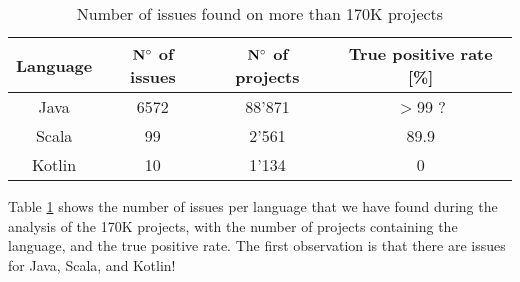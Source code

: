 \begin{table}[h]
	\centering
	\caption{Number of issues found on more than 170K projects}
	\label{table:large_scale_issues}
	\begin{tabular}{|c|c|c|c|}
		\hline
		\bf Language & \bf $\bf N^{\circ}$ of issues & \bf $\bf N^{\circ}$  of projects & \bf True positive rate [\%] \\ \hline
		Java & 6572 & 88'871 & $>$99 ? \\
		Scala & 99 & 2'561 & 89.9 \\
		Kotlin & 10 & 1'134 & 0 \\ \hline
	\end{tabular}
\end{table}

Table \ref{table:large_scale_issues} shows the number of issues per language that we have found during the analysis of the 170K projects, with the number of projects containing the language, and the true positive rate.
The first observation is that there are issues for Java, Scala, and Kotlin!

